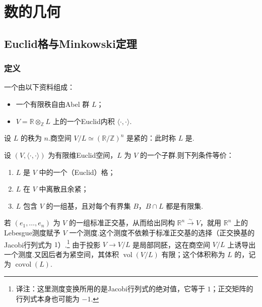 \chapter{数的几何}\label{chap:nt-5}
\section{Euclid格与Minkowski定理}\label{sec:nt-5-1}
\subsection{定义}\label{sec:nt-5-1-1}
一个由以下资料组成：
\begin{itemize}
\item 一个有限秩自由Abel 群 $L$；
\item $V=\mathbb R\otimes_{\mathbb Z}L$ 上的一个Euclid内积 $\langle\cdot,\cdot\rangle$.
\end{itemize}
设 $L$ 的秩为 $n$.商空间 $V/L\simeq(\mathbb R/\mathbb Z)^n$ 是紧的：此时称 $L$ 是.
\begin{exercise*}\label{ex:nt-5-1-lattice}
设 $(V,\langle\cdot,\cdot\rangle)$ 为有限维Euclid空间，$L$ 为 $V$ 的一个子群.则下列条件等价：
\begin{enumerate}[label=\roman*)]
\item $L$ 是 $V$ 中的一个（Euclid）格；
\item $L$ 在 $V$ 中离散且余紧；
\item $L$ 包含 $V$ 的一组基，且对每个有界集 $B$，$B\cap L$ 都是有限集.
\end{enumerate}
\end{exercise*}
若 $(e_1,\ldots,e_n)$ 为 $V$ 的一组标准正交基，从而给出同构 $\mathbb R^n\xrightarrow{\sim}V$，就用 $\mathbb R^n$ 上的Lebesgue测度赋予 $V$ 一个测度.这个测度不依赖于标准正交基的选择（正交换基的Jacobi行列式为 $1$）.\footnote{译注：这里测度变换所用的是Jacobi行列式的绝对值，它等于 $1$；正交矩阵的行列式本身也可能为 $-1$.}
由于投影 $V\longrightarrow V/L$ 是局部同胚，这在商空间 $V/L$ 上诱导出一个测度.又因后者为紧空间，其体积 $\operatorname{vol}(V/L)$ 有限；这个体积称为 $L$ 的，记为 $\operatorname{covol}(L)$.
